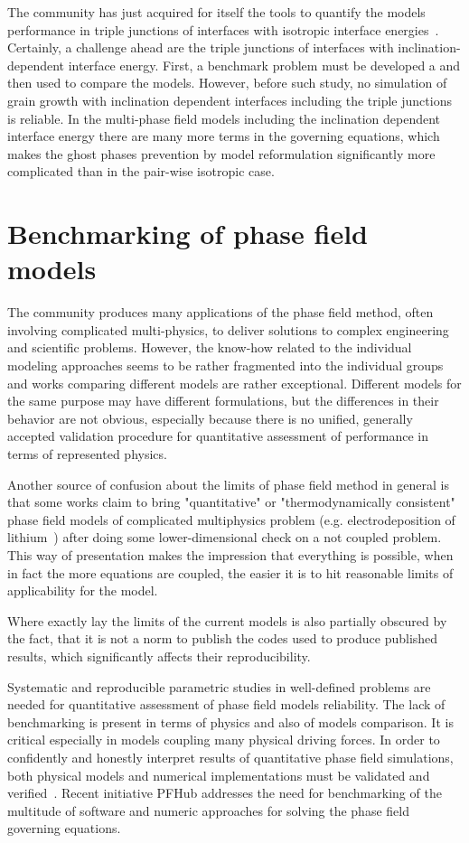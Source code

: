 	The community has just acquired for itself the tools to quantify the models performance in triple junctions of interfaces with isotropic interface energies~\cite{Daubner2023}. Certainly, a challenge ahead are the triple junctions of interfaces with inclination-dependent interface energy.	First, a benchmark problem must be developed a and then used to compare the models. However, before such study, no simulation of grain growth with inclination dependent interfaces including the triple junctions is reliable. In the multi-phase field models including the inclination dependent interface energy there are many more terms in the governing equations, which makes the ghost phases prevention by model reformulation significantly more complicated than in the pair-wise isotropic case. 

\section{Benchmarking of phase field models}
The community produces many applications of the phase field method, often involving complicated multi-physics, to deliver solutions to complex engineering and scientific problems. However, the know-how related to the individual modeling approaches seems to be rather fragmented into the individual groups and works comparing different models are rather exceptional. Different models for the same purpose may have different formulations, but the differences in their behavior are not obvious, especially because there is no unified, generally accepted validation procedure for quantitative assessment of performance in terms of represented physics. 

Another source of confusion about the limits of phase field method in general is that some works claim to bring "quantitative" or "thermodynamically consistent" phase field models of complicated multiphysics problem (e.g. electrodeposition of lithium~\cite{Chen2015}) after doing some lower-dimensional check on a not coupled problem. This way of presentation makes the impression that everything is possible, when in fact the more equations are coupled, the easier it is to hit reasonable limits of applicability for the model.

Where exactly lay the limits of the current models is also partially obscured by the fact, that it is not a norm to publish the codes used to produce published results, which significantly affects their reproducibility. 

Systematic and reproducible parametric studies in well-defined problems are needed for quantitative assessment of phase field models reliability. The lack of benchmarking is present in terms of physics and also of models comparison. It is critical especially in models coupling many physical driving forces. In order to confidently and honestly interpret results of quantitative phase field simulations, both physical models and numerical implementations must be validated and verified~\cite{Jokisaari2017}. Recent initiative PFHub addresses the need for benchmarking of the multitude of software and numeric approaches for solving the phase field governing equations. 


